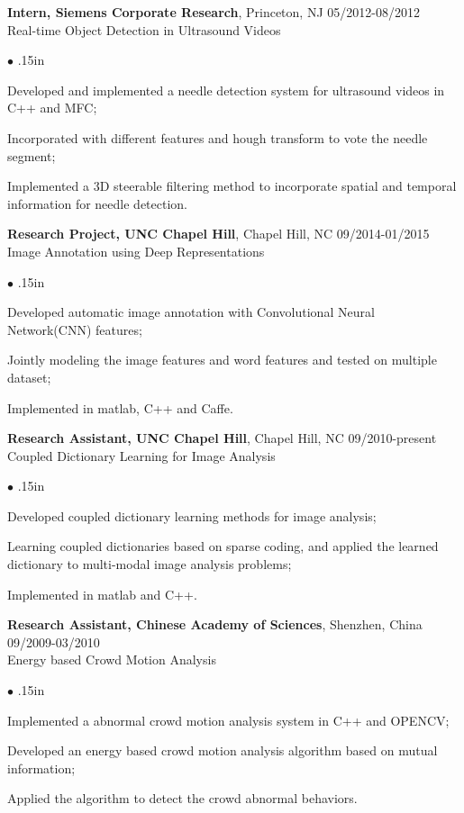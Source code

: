 \documentclass[line,margin]{res}
\newenvironment{bullets}{\begin{list}{\tiny$\bullet$}{\topsep 0pt \itemsep -2pt \leftmargin .15in}}{\vspace*{4pt}\end{list}}
\begin{document}
\begin{resume}
		\textbf{Intern, Siemens Corporate Research}, Princeton, NJ \hfill      05/2012-08/2012 \\
		Real-time Object Detection in Ultrasound Videos
		\begin{bullets} 
			\item Developed and implemented a needle detection system for ultrasound videos in C++ and MFC;
			\item Incorporated with different features and hough transform to vote the needle segment;
			\item Implemented a 3D steerable filtering method to incorporate spatial and temporal information for needle detection.
		\end{bullets}
		\vspace{-.1in}
		
		\textbf{Research Project, UNC Chapel Hill}, Chapel Hill, NC  \hfill      09/2014-01/2015 \\
		Image Annotation using Deep Representations %
		\begin{bullets}
			\item Developed automatic image annotation with Convolutional Neural Network(CNN) features;
			\item Jointly modeling the image features and word features and tested on multiple dataset;
			\item Implemented in matlab, C++ and Caffe.
		\end{bullets}
		\vspace{-.1in}
		
		\textbf{Research Assistant, UNC Chapel Hill}, Chapel Hill, NC  \hfill      09/2010-present \\
		Coupled Dictionary Learning for Image Analysis %
		\begin{bullets}
			\item Developed coupled dictionary learning methods for image analysis;
			\item Learning coupled dictionaries based on sparse coding, and applied the learned dictionary to multi-modal image analysis problems;
			\item Implemented in matlab and C++.
		\end{bullets}
		\vspace{-.1in}
		
		
		\textbf{Research Assistant, Chinese Academy of Sciences}, Shenzhen, China   \hfill      09/2009-03/2010 \\ %
		Energy based Crowd Motion Analysis
		\begin{bullets}
			\item Implemented a abnormal crowd motion analysis system in C++ and OPENCV;
			\item Developed an energy based crowd motion analysis algorithm based on mutual information;
			\item Applied the algorithm to detect the crowd abnormal behaviors.
		\end{bullets}
		\vspace{-.1in}
		

\end{resume}
\end{document}
